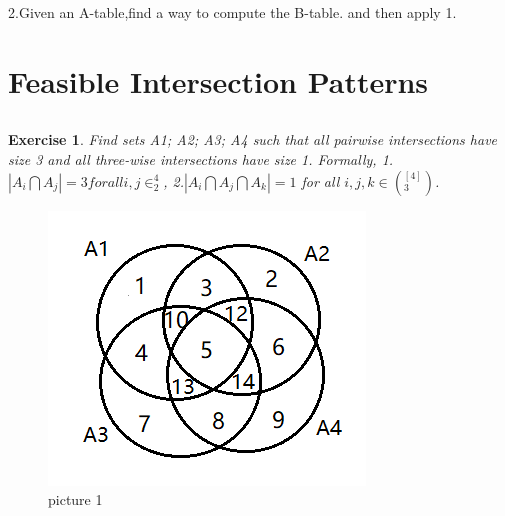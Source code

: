 \documentclass[12pt,a4]{article}
\newtheorem{exercise}[theorem]{Exercise}
\begin{document}
2.Given an A-table,find a way to compute the B-table.
and then apply 1. 

\section{Feasible Intersection Patterns}

\subsection{}

\begin{exercise}
  Find sets A1; A2; A3; A4 such that all pairwise intersections have size 3 and all three-wise intersections have size 1. Formally,
 1.$|A_i\bigcap A_j| = 3 for all {i,j} \in ^4_2$,
 2.$|A_i\bigcap A_j\bigcap A_k| = 1$ for all ${i,j,k}\in (^{[4]}_{3})$.
\end{exercise}
    \begin{figure}[h]
	\begin{center}
		\includegraphics[width=0.32\linewidth]{Exercise3.1-1.png}
		\caption{picture 1}
		\label{Fig:1}
	\end{center}
	\vspace{-0.5em}
    \end{figure}
\end{document}
